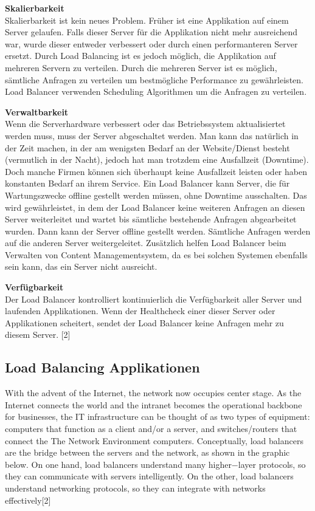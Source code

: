 \textbf{Skalierbarkeit} \\

Skalierbarkeit ist kein neues Problem. Früher ist eine Applikation auf einem Server gelaufen. Falls dieser Server für die Applikation nicht mehr ausreichend war, wurde dieser entweder verbessert oder durch einen performanteren Server ersetzt. Durch Load Balancing ist es jedoch möglich, die Applikation auf mehreren Servern zu verteilen. Durch die mehreren Server ist es möglich, sämtliche Anfragen zu verteilen um bestmögliche Performance zu gewährleisten. Load Balancer verwenden Scheduling Algorithmen um die Anfragen zu verteilen. 

\textbf{Verwaltbarkeit} \\

Wenn die Serverhardware verbessert oder das Betriebssystem aktualisiertet werden muss, muss der Server abgeschaltet werden. Man kann das natürlich in der Zeit machen, in der am wenigsten Bedarf an der Website/Dienst besteht (vermutlich in der Nacht), jedoch hat man trotzdem eine Ausfallzeit (Downtime). Doch manche Firmen können sich überhaupt keine Ausfallzeit leisten oder haben konstanten Bedarf  an ihrem Service. Ein Load Balancer kann Server, die für Wartungszwecke offline gestellt werden müssen, ohne Downtime ausschalten. Das wird gewährleistet, in dem der Load Balancer keine weiteren Anfragen an diesen Server weiterleitet und wartet bis sämtliche bestehende Anfragen abgearbeitet wurden. Dann kann der Server offline gestellt werden. Sämtliche Anfragen werden auf die anderen Server weitergeleitet. Zusätzlich helfen Load Balancer beim Verwalten von Content Managementsystem, da es bei solchen Systemen ebenfalls sein kann, das ein Server nicht ausreicht.   

\textbf{Verfügbarkeit} \\

Der Load Balancer kontrolliert kontinuierlich die Verfügbarkeit aller Server und laufenden Applikationen. Wenn der Healthcheck einer dieser Server oder Applikationen scheitert, sendet der Load Balancer keine Anfragen mehr zu diesem Server. [2]

\subsection{Load Balancing Applikationen}
\label{sec:Load Balancing Applikationen}
With the advent of the Internet, the network now occupies center stage. As the Internet connects the world and the intranet becomes the operational backbone for businesses, the IT infrastructure can be thought of as two types of equipment: computers that function as a client and/or a server, and switches/routers that connect the The Network Environment computers. Conceptually, load balancers are the bridge between the servers and the network, as shown in the graphic below. On one hand, load balancers understand many higher−layer protocols, so they can communicate with servers intelligently. On the other, load balancers understand networking protocols, so they can integrate with networks effectively[2]

